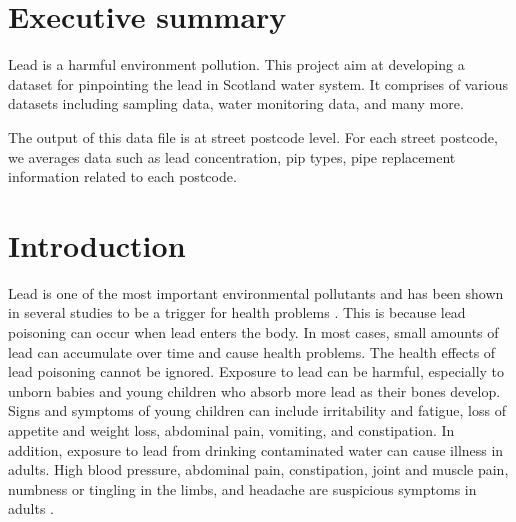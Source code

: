 \documentclass[11pt,twoside]{article}
\numberwithin{Theorem}{section}
\numberwithin{Definition}{section}
\numberwithin{Lemma}{section}
\numberwithin{Algorithm}{section}
\numberwithin{equation}{section}
\begin{document}
\cleardoublepage

\setcounter{page}{1}


\clearpage

\section*{Executive summary}
\label{sec.summary}
Lead is a harmful environment pollution.
This project aim at developing a dataset for pinpointing
the lead in Scotland water system.
It comprises of various datasets including sampling data,
water monitoring data, and many more.

The output of this data file is at street postcode level.
For each street postcode,
we averages data such as lead concentration, pip types,
pipe replacement information related to each postcode.

\clearpage

\section{Introduction}
\label{sec.intro}
Lead is one of the most important environmental pollutants and has been shown in several studies to be a trigger for health problems \cite{ei}. This is because lead poisoning can occur when lead enters the body. In most cases, small amounts of lead can accumulate over time and cause health problems. The health effects of lead poisoning cannot be ignored. Exposure to lead can be harmful, especially to unborn babies and young children who absorb more lead as their bones develop. Signs and symptoms of young children can include irritability and fatigue, loss of appetite and weight loss, abdominal pain, vomiting, and constipation. In addition, exposure to lead from drinking contaminated water can cause illness in adults. High blood pressure, abdominal pain, constipation, joint and muscle pain, numbness or tingling in the limbs, and headache are suspicious symptoms in adults \cite[Scottish Water]{sw}.
\end{document}
